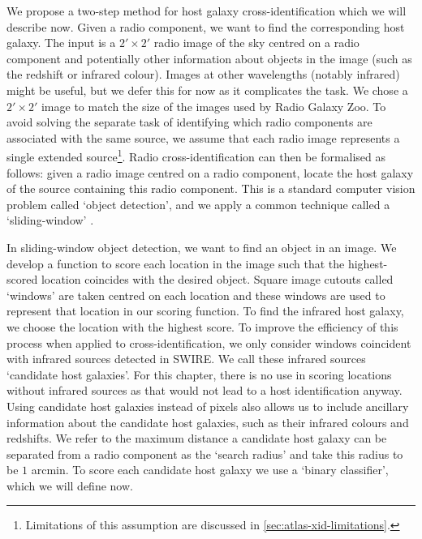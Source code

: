 \documentclass[11pt, a4paper]{book}
\begin{document}
    We propose a two-step method for host galaxy cross-identification
    {which we will describe now}. Given a radio component, we want to find
    the corresponding host galaxy. The input is a $2' \times
    2'$ radio image of
    the sky centred on a radio component {and potentially other information about
    objects in the image (such as the redshift or infrared colour)}. {Images at other wavelengths (notably infrared) might be
    useful, but we defer this for now as it complicates the task.
    {We chose a $2' \times 2'$ image to match} the size of the images used
    by Radio Galaxy Zoo. To avoid solving the separate task of identifying
    which radio components are associated with the same source, we assume
    that each radio image represents a single extended
    source\footnote{Limitations of this assumption are discussed in
    \autoref{sec:atlas-xid-limitations}.}. Radio cross-identification can then
    be formalised as follows: given a radio image centred on a radio
    component, locate the host galaxy of the source containing this radio
    component. This is a standard computer vision problem called `object
    detection', and we apply a common technique called a `sliding-window'
    \citep{rowley1996facedetection}}.

    {In sliding-window object detection, we want to find an object in an image.
    We develop a function to score each location in the image such that the
    highest-scored location coincides with the desired object. Square image
    cutouts called `windows' are taken centred on each location and these
    windows are used to represent that location in our scoring function. To
    find the infrared host galaxy, we choose the location with the highest
    score. To improve the efficiency of this process when applied to
    cross-identification, we only consider windows coincident with infrared
    sources detected in SWIRE. We call these infrared sources `candidate
    host galaxies'. For this chapter, there is no use in scoring
    locations without infrared sources as that would not lead to a host identification
    anyway. Using candidate host galaxies instead of pixels also
    allows us to include ancillary information about the candidate host
    galaxies, such as their infrared colours and redshifts. We refer to the
    maximum distance a candidate host galaxy can be separated from a radio component as
    the `search radius' and take this radius to be $1$ arcmin. To score each
    candidate host galaxy we use a `binary classifier', which we will define
    now.}
\end{document}
